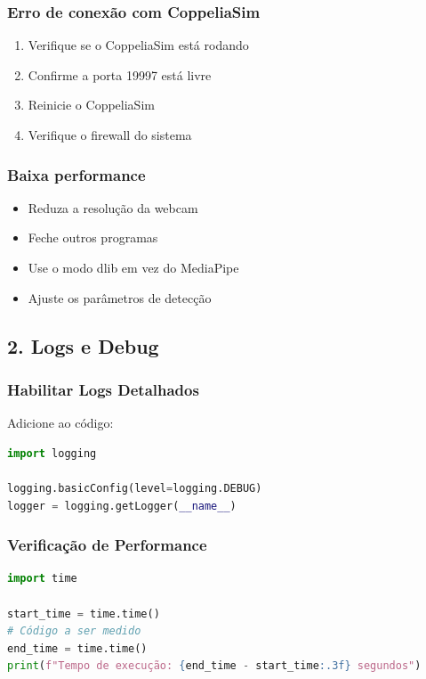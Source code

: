 \documentclass[12pt,a4paper]{article}
\begin{document}
\subsubsection{Erro de conexão com CoppeliaSim}

\begin{enumerate}
    \item Verifique se o CoppeliaSim está rodando
    \item Confirme a porta 19997 está livre
    \item Reinicie o CoppeliaSim
    \item Verifique o firewall do sistema
\end{enumerate}

\subsubsection{Baixa performance}

\begin{itemize}
    \item Reduza a resolução da webcam
    \item Feche outros programas
    \item Use o modo dlib em vez do MediaPipe
    \item Ajuste os parâmetros de detecção
\end{itemize}

\subsection{2. Logs e Debug}

\subsubsection{Habilitar Logs Detalhados}

Adicione ao código:

\begin{lstlisting}[language=python]
import logging

logging.basicConfig(level=logging.DEBUG)
logger = logging.getLogger(__name__)
\end{lstlisting}

\subsubsection{Verificação de Performance}

\begin{lstlisting}[language=python]
import time

start_time = time.time()
# Código a ser medido
end_time = time.time()
print(f"Tempo de execução: {end_time - start_time:.3f} segundos")
\end{lstlisting}
\end{document}
